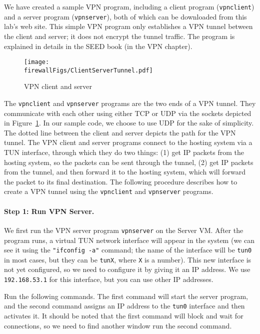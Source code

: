We have created a sample VPN program, including a client program (\texttt{vpnclient})  and
a server program (\texttt{vpnserver}), both of which can be downloaded from
this lab's web site. This simple VPN program only establishes a VPN tunnel 
between the client and server; it does not encrypt the tunnel traffic.
The program is explained in details in the SEED book (in the VPN chapter).


\begin{figure}[htb]
\begin{center}
\texttt{[image: \\firewallFigs/ClientServerTunnel.pdf]}
\end{center}
\caption{VPN client and server}
\label{vpn_firewall:fig:client_server}
\end{figure}

The \texttt{vpnclient} and \texttt{vpnserver} programs are the two ends of
a VPN tunnel. They communicate with each other using either TCP or UDP via the sockets
depicted in Figure~\ref{vpn_firewall:fig:client_server}. In our sample code, we choose
to use UDP for the sake of simplicity.  The dotted line between the
client and server depicts the path for the VPN tunnel.
The VPN client and server programs connect to the hosting system via a
TUN interface, through which they do two things: (1) get IP packets from
the hosting system, so the packets can be sent through the tunnel, (2) get IP packets from the
tunnel, and then forward it to the hosting system, which will forward the
packet to its final destination.
The following procedure describes how to create a VPN tunnel
using the \texttt{vpnclient} and \texttt{vpnserver} programs.


\paragraph{Step 1: Run VPN Server.}
We first run the VPN server program \texttt{vpnserver} on the Server VM.
After the program runs, a virtual TUN network interface will appear
in the system (we can see it using the \texttt{"ifconfig -a"} command; the name of the
interface will be \texttt{tun0} in most cases, but they can be
\texttt{tunX}, where \texttt{X} is a number).
This new interface is not yet configured, so we need to configure it by giving it an IP
address. We use \texttt{192.168.53.1} for this interface, but you can use 
other IP addresses. 


Run the following commands. The first command will start the server
program, and the second command assigns an IP address to the \texttt{tun0}
interface and then activates it. It should be noted that the first
command will block and wait for connections,
so we need to find another window run the second command.


